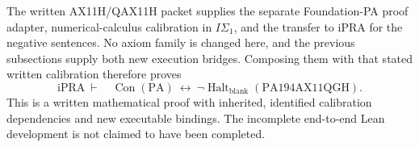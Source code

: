 The written AX11H/QAX11H packet supplies the separate
Foundation-PA proof adapter, numerical-calculus calibration in
$I\Sigma_1$, and the transfer to iPRA for the negative sentences.
No axiom family is changed here, and the previous subsections supply
both new execution bridges.  Composing them with that stated written
calibration therefore proves
\[
 \mathrm{iPRA}\ \vdash\quad
 \operatorname{Con}(\mathrm{PA})\ \longleftrightarrow\
 \neg\operatorname{Halt}_{\mathrm{blank}}(\mathrm{PA194AX11QGH}).
\]
This is a written mathematical proof with inherited, identified
calibration dependencies and new executable bindings.  The incomplete
end-to-end Lean development is not claimed to have been completed.
